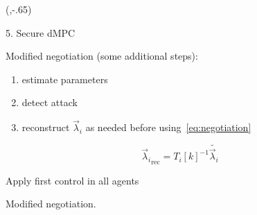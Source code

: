 \documentclass[presentation]{beamer}
\begin{document}
\begin{frame}
  \begin{textblock}{5.1}(\thirdcol,-.65)
    \begin{block}{5. Secure dMPC}
      \begin{center}
        \begin{minipage}[c]{.965\textwidth}
          Modified negotiation (some additional steps):
          \begin{enumerate}
            \item estimate parameters
            \item detect attack
            \item reconstruct $\vec{\lambda}_{i}$ as needed before using~\eqref{eq:negotiation}
          \end{enumerate}
          \begin{equation}
            \label{eq:lambda_reconstruction}
            {\vec{\lambda}_{i}}_{\mathrm{rec}}=\widehat{{T_{i}[k]}^{-1}} \tilde{\vec{\lambda}_{i}}
          \end{equation}
          \vspace{1cm}
        \begin{algorithm2e}[h]
          \DontPrintSemicolon
          Apply first control in all agents
          \caption{Modified negotiation.}\label{alg:safeDMPC}
        \end{algorithm2e}
        \vspace{.5cm}
      \end{minipage}
      \end{center}
    \end{block}
  \end{textblock}


\end{frame}
\end{document}
